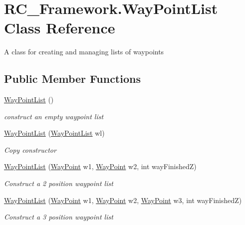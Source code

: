 \hypertarget{class_r_c___framework_1_1_way_point_list}{}\section{R\+C\+\_\+\+Framework.\+Way\+Point\+List Class Reference}
\label{class_r_c___framework_1_1_way_point_list}


A class for creating and managing lists of waypoints  


\subsection*{Public Member Functions}
\begin{DoxyCompactItemize}
\item 
\mbox{\hyperlink{class_r_c___framework_1_1_way_point_list_a0928340fd1b2b35c0a65781d192c68bb}{Way\+Point\+List}} ()
\begin{DoxyCompactList}\small\item\em construct an empty waypoint list \end{DoxyCompactList}\item 
\mbox{\hyperlink{class_r_c___framework_1_1_way_point_list_aa6f1a51f6d7703f3629b4355e714ee14}{Way\+Point\+List}} (\mbox{\hyperlink{class_r_c___framework_1_1_way_point_list}{Way\+Point\+List}} wl)
\begin{DoxyCompactList}\small\item\em Copy constructor \end{DoxyCompactList}\item 
\mbox{\hyperlink{class_r_c___framework_1_1_way_point_list_a09f5b120330425543ceed74153bad906}{Way\+Point\+List}} (\mbox{\hyperlink{class_r_c___framework_1_1_way_point}{Way\+Point}} w1, \mbox{\hyperlink{class_r_c___framework_1_1_way_point}{Way\+Point}} w2, int way\+FinishedZ)
\begin{DoxyCompactList}\small\item\em Construct a 2 position waypoint list \end{DoxyCompactList}\item 
\mbox{\hyperlink{class_r_c___framework_1_1_way_point_list_a9c757a15b345cd24f2506766834dd9eb}{Way\+Point\+List}} (\mbox{\hyperlink{class_r_c___framework_1_1_way_point}{Way\+Point}} w1, \mbox{\hyperlink{class_r_c___framework_1_1_way_point}{Way\+Point}} w2, \mbox{\hyperlink{class_r_c___framework_1_1_way_point}{Way\+Point}} w3, int way\+FinishedZ)
\begin{DoxyCompactList}\small\item\em Construct a 3 position waypoint list \end{DoxyCompactList}\item 

\end{DoxyCompactItemize}
